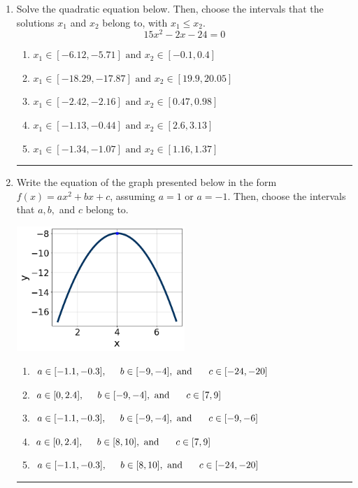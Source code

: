 \documentclass[14pt]{extbook}
\newcommand{\litem}[1]{\item#1\hspace*{-1cm}\rule{\textwidth}{0.4pt}}
\begin{document}
\begin{enumerate}
{\begin{enumerate}[label=\Alph*.]
\end{enumerate} }
\litem{
Solve the quadratic equation below. Then, choose the intervals that the solutions $x_1$ and $x_2$ belong to, with $x_1 \leq x_2$.\[ 15x^{2} -2 x -24 = 0 \]\begin{enumerate}[label=\Alph*.]
\item \( x_1 \in [-6.12, -5.71] \text{ and } x_2 \in [-0.1, 0.4] \)
\item \( x_1 \in [-18.29, -17.87] \text{ and } x_2 \in [19.9, 20.05] \)
\item \( x_1 \in [-2.42, -2.16] \text{ and } x_2 \in [0.47, 0.98] \)
\item \( x_1 \in [-1.13, -0.44] \text{ and } x_2 \in [2.6, 3.13] \)
\item \( x_1 \in [-1.34, -1.07] \text{ and } x_2 \in [1.16, 1.37] \)

\end{enumerate} }
\litem{
Write the equation of the graph presented below in the form $f(x)=ax^2+bx+c$, assuming  $a=1$ or $a=-1$. Then, choose the intervals that $a, b,$ and $c$ belong to.
\begin{center}
    \includegraphics[width=0.5\textwidth]{../Figures/quadraticGraphToEquationCopyA.png}
\end{center}
\begin{enumerate}[label=\Alph*.]
\item \( a \in [-1.1, -0.3], \hspace*{5mm} b \in [-9, -4], \text{ and } \hspace*{5mm} c \in [-24, -20] \)
\item \( a \in [0, 2.4], \hspace*{5mm} b \in [-9, -4], \text{ and } \hspace*{5mm} c \in [7, 9] \)
\item \( a \in [-1.1, -0.3], \hspace*{5mm} b \in [-9, -4], \text{ and } \hspace*{5mm} c \in [-9, -6] \)
\item \( a \in [0, 2.4], \hspace*{5mm} b \in [8, 10], \text{ and } \hspace*{5mm} c \in [7, 9] \)
\item \( a \in [-1.1, -0.3], \hspace*{5mm} b \in [8, 10], \text{ and } \hspace*{5mm} c \in [-24, -20] \)


\end{enumerate}}
\end{enumerate}
\end{document}
